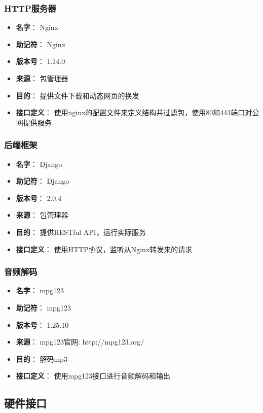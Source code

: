 \subsubsection{HTTP服务器} %
\begin{itemize}
	\item \textbf{名字}：
	Nginx
	\item \textbf{助记符}：
	Nginx
	\item \textbf{版本号}：
	1.14.0
	\item \textbf{来源}：
	包管理器
	\item \textbf{目的}：
	提供文件下载和动态网页的换发
	\item \textbf{接口定义}：
	使用nginx的配置文件来定义结构并过滤包，使用80和443端口对公网提供服务
\end{itemize}

\subsubsection{后端框架} %
\begin{itemize}
	\item \textbf{名字}：
	Django
	\item \textbf{助记符}：
	Django
	\item \textbf{版本号}：
	2.0.4
	\item \textbf{来源}：
	包管理器
	\item \textbf{目的}：
	提供RESTful API，运行实际服务
	\item \textbf{接口定义}：
	使用HTTP协议，监听从Nginx转发来的请求
\end{itemize}

\subsubsection{音频解码}
\begin{itemize}
	\item \textbf{名字}：
	mpg123
	\item \textbf{助记符}：
	mpg123
	\item \textbf{版本号}：
	1.25.10
	\item \textbf{来源}：
	mpg123官网: http://mpg123.org/
	\item \textbf{目的}：
	解码mp3
	\item \textbf{接口定义}：
	使用mpg123接口进行音频解码和输出
\end{itemize}

\subsection{硬件接口}

